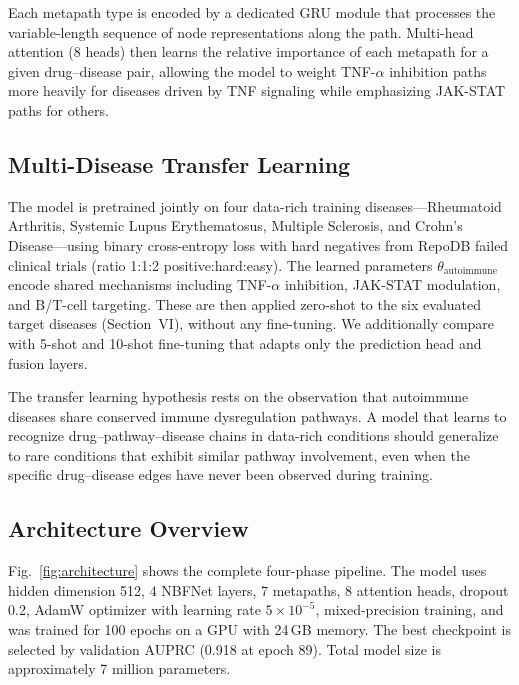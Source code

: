 \documentclass[conference]{IEEEtran}
\begin{document}
Each metapath type is encoded by a dedicated GRU module that processes the variable-length sequence of node representations along the path. Multi-head attention (8 heads) then learns the relative importance of each metapath for a given drug--disease pair, allowing the model to weight TNF-$\alpha$ inhibition paths more heavily for diseases driven by TNF signaling while emphasizing JAK-STAT paths for others.

\subsection{Multi-Disease Transfer Learning}

The model is pretrained jointly on four data-rich training diseases---Rheumatoid Arthritis, Systemic Lupus Erythematosus, Multiple Sclerosis, and Crohn's Disease---using binary cross-entropy loss with hard negatives from RepoDB failed clinical trials (ratio 1:1:2 positive:hard:easy). The learned parameters $\theta_{\text{autoimmune}}$ encode shared mechanisms including TNF-$\alpha$ inhibition, JAK-STAT modulation, and B/T-cell targeting. These are then applied zero-shot to the six evaluated target diseases (Section~VI), without any fine-tuning. We additionally compare with 5-shot and 10-shot fine-tuning that adapts only the prediction head and fusion layers.

The transfer learning hypothesis rests on the observation that autoimmune diseases share conserved immune dysregulation pathways. A model that learns to recognize drug--pathway--disease chains in data-rich conditions should generalize to rare conditions that exhibit similar pathway involvement, even when the specific drug--disease edges have never been observed during training.

\subsection{Architecture Overview}

Fig.~\ref{fig:architecture} shows the complete four-phase pipeline. The model uses hidden dimension 512, 4 NBFNet layers, 7 metapaths, 8 attention heads, dropout 0.2, AdamW optimizer with learning rate $5 \times 10^{-5}$, mixed-precision training, and was trained for 100 epochs on a GPU with 24\,GB memory. The best checkpoint is selected by validation AUPRC (0.918 at epoch 89). Total model size is approximately 7 million parameters.

\end{document}
